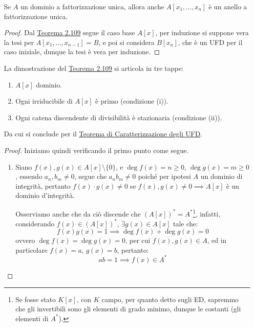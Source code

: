 \documentclass[11pt]{scrartcl}
\begin{document}
\begin{corollary}
    Se $A$ un dominio a fattorizzazione unica, allora anche $A[x_1,\ldots,x_n]$ è un anello a fattorizzazione unica.
\end{corollary}

\begin{proof}
    Dal \hyperref[2.109]{Teorema 2.109} segue il caso base $A[x]$, per induzione si suppone vera la tesi per $A[x_1,\ldots,x_{n-1}] = B$, e poi si considera $B[x_n]$, che è un UFD per il caso iniziale,
    dunque la tesi è vera per induzione.
\end{proof}

\begin{remark}
    La dimostrazione del \hyperref[2.109]{Teorema 2.109} si articola in tre tappe:
    \begin{enumerate}[(1)]
        \item $A[x]$ dominio.
        \item Ogni irriducibile di $A[x]$ è primo (condizione (i)).
        \item Ogni catena discendente di divisibilità è stazionaria (condizione (ii)).
    \end{enumerate}
    Da cui si conclude per il \hyperref[2.101]{Teorema di Caratterizzazione degli UFD}.
\end{remark}

\begin{proof}
    Iniziamo quindi verificando il primo punto come segue.
    \begin{enumerate}[(1)]
        \item Siano $f(x),g(x) \in A[x] \setminus\{0\}$, e $\deg f(x) = n \geq 0$, $\deg g(x) = m \geq 0$, essendo $a_n, b_m \ne 0$, segue che
        $a_nb_m \ne 0$ poiché per ipotesi $A$ un dominio di integrità, pertanto $f(x) \cdot g(x) \ne 0$ se $f(x),g(x) \ne 0 \implies A[x]$ è un dominio d'integrità.
        \begin{remark}
            Osserviamo anche che da ciò discende che $(A[x])^* = A^*$\footnote{Se fosse stato $K[x]$, con $K$ campo, per quanto detto sugli ED, sapremmo che gli invertibili sono gli elementi di grado minimo, dunque le costanti (gli elementi di $A^*$).}, infatti, considerando $f(x) \in (A[x])^*$, $\exists g(x) \in A[x]$ tale che:
            \[ f(x)g(x) = 1 \implies \deg f(x) + \deg g(x) = 0
                \]
            ovvero $\deg f(x) = \deg g(x) = 0$, per cui $f(x),g(x) \in A$, ed in particolare $f(x) = a$, $g(x) = b$, pertanto:
            \[ ab = 1 \implies f(x) \in A^*
                \]
        \end{remark}
    \end{enumerate}
\end{proof}
\end{document}
